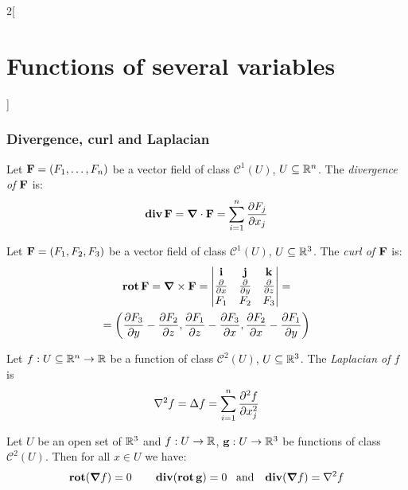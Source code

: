 \documentclass[../../../main.tex]{subfiles}
\begin{document}
\begin{multicols}{2}[\section{Functions of several variables}]
  \subsubsection{Divergence, curl and Laplacian}
  \begin{definition}
    Let $\boldsymbol{\mathrm{F}}=(F_1,\ldots, F_n)$ be a vector field of class $\mathcal{C}^1(U)$, $U\subseteq\mathbb{R}^n$. The \textit{divergence of $\boldsymbol{\mathrm{F}}$} is: $$\operatorname{\boldsymbol{\mathrm{div}}}\boldsymbol{\mathrm{F}}=\boldsymbol{\mathrm{\nabla}}\cdot\boldsymbol{\mathrm{F}}=\sum_{i=1}^n\frac{\partial F_j}{\partial x_j}$$
  \end{definition}
  \begin{definition}
    Let $\boldsymbol{\mathrm{F}}=(F_1,F_2,F_3)$ be a vector field of class $\mathcal{C}^1(U)$, $U\subseteq\mathbb{R}^3$. The \textit{curl of $\boldsymbol{\mathrm{F}}$} is:
    \begin{multline*}
      \operatorname{\boldsymbol{\mathrm{rot}}}\boldsymbol{\mathrm{F}}=\boldsymbol{\mathrm{\nabla}}\times\boldsymbol{\mathrm{F}}=
      \begin{vmatrix}
        \boldsymbol{\mathrm{i}}                      & \boldsymbol{\mathrm{j}}                      & \boldsymbol{\mathrm{k}}                      \\
        \frac{\partial}{\partial x} & \frac{\partial}{\partial y} & \frac{\partial}{\partial z} \\
        F_1                         & F_2                         & F_3                         \\
      \end{vmatrix}=\\=\left(\frac{\partial F_3}{\partial y}-\frac{\partial F_2}{\partial z},\frac{\partial F_1}{\partial z}-\frac{\partial F_3}{\partial x},\frac{\partial F_2}{\partial x}-\frac{\partial F_1}{\partial y}\right)
    \end{multline*}
  \end{definition}
  \begin{definition}
    Let $f:U\subseteq\mathbb{R}^n\rightarrow\mathbb{R} $ be a function of class $\mathcal{C}^2(U)$, $U\subseteq\mathbb{R}^3$. The \textit{Laplacian of $f$} is $$\laplacian f=\Delta f=\sum_{i=1}^n\frac{\partial^2 f}{\partial x_j^2}$$
  \end{definition}
  \begin{prop}
    Let $U$ be an open set of $\mathbb{R}^3$ and $f:U\rightarrow\mathbb{R} $, $\boldsymbol{\mathrm{g}}:U\rightarrow\mathbb{R}^3$ be functions of class $\mathcal{C}^2(U)$. Then for all $x\in U$ we have: $$\rot(\grad f)=0\qquad\div(\rot\vf{g})=0\;\;\;\text{and}\;\;\;\div(\grad f)=\laplacian f$$
  \end{prop}

\end{multicols}
\end{document}
